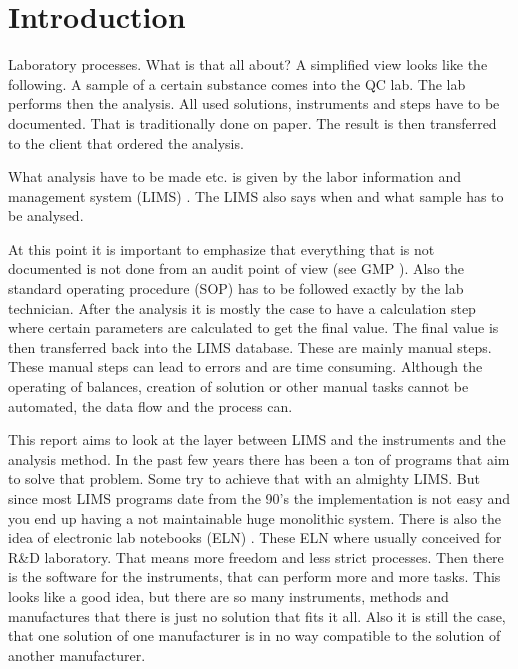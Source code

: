 \documentclass[paper=a4,twoside=false,BCOR=0mm,DIV=calc,fontsize=12pt]{scrartcl}
\begin{document}
\newpage
    \setcounter{tocdepth}{2}
	\tableofcontents

\newpage
\section{Introduction}
Laboratory processes. What is that all about? A simplified view looks like the following. A sample of a certain substance comes into the QC lab. 
The lab performs then the analysis. All used solutions, instruments and steps have to be documented. That is traditionally done on paper. The result is then transferred to the client that ordered the analysis.

What analysis have to be made etc. is given by the labor information and management system (LIMS) \cite{lims}. The LIMS also says when and what sample has to be analysed.

At this point it is important to emphasize that everything that is not documented is not done from an audit point of view (see GMP \cite{gmp}). Also the standard operating procedure (SOP) has to be followed exactly by the lab technician.
After the analysis it is mostly the case to have a calculation step where certain parameters are calculated to get the final value. The final value is then transferred back into the LIMS database. These are mainly manual steps. These manual steps can lead to errors and are time consuming.
Although the operating of balances, creation of solution or other manual tasks cannot be automated, the data flow and the process can.

This report aims to look at the layer between LIMS and the instruments and the analysis method. In the past few years there has been a ton of programs that aim to solve that problem. Some try to achieve that with an almighty LIMS. But since most LIMS programs date from the 90's the implementation is not easy and you end up having a not maintainable huge monolithic system. There is also the idea of electronic lab notebooks (ELN) \cite{eln}. These ELN where usually conceived for R\&D laboratory. That means more freedom and less strict processes.
Then there is the software for the instruments, that can perform more and more tasks. This looks like a good idea, but there are so many instruments, methods and manufactures that there is just no solution that fits it all. Also it is still the case, that one solution of one manufacturer is in no way compatible to the solution of another manufacturer.
\end{document}
